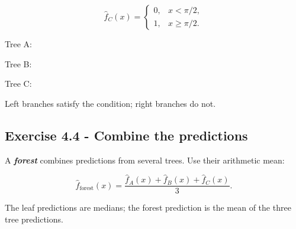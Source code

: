 \documentclass[10pt]{article}
\begin{document}
\[
\hat f_C(x)=\begin{cases}0,&x<\pi/2,\\1,&x\geq \pi/2.\end{cases}
\]

Tree A:
\begin{center}\end{center}
Tree B:
\begin{center}\end{center}
Tree C:
\begin{center}\end{center}

Left branches satisfy the condition; right branches do not.

\par\endgroup

\subsection*{Exercise 4.4 - Combine the predictions}
A \textbf{\textit{forest}} combines predictions from several trees. Use their arithmetic mean:

\[
\hat f_{\mathrm{forest}}(x)=\frac{\hat f_A(x)+\hat f_B(x)+\hat f_C(x)}3.
\]

The leaf predictions are medians; the forest prediction is the mean of the three tree predictions.
\end{document}
